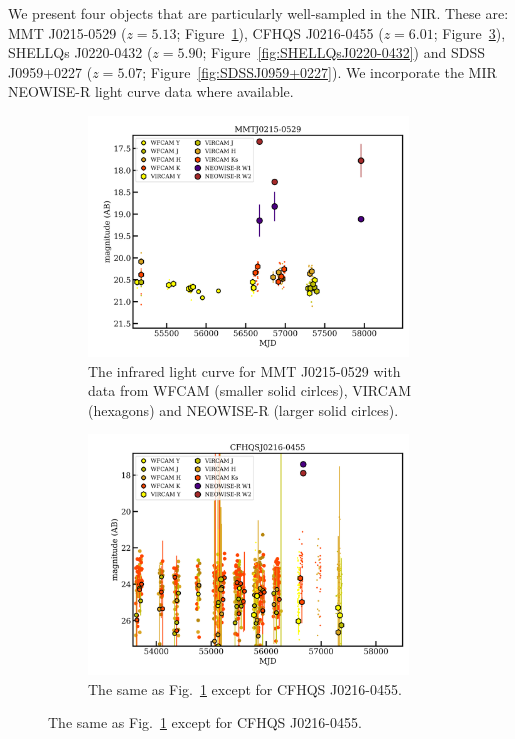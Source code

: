 \documentclass[usenatbib]{mnras}
\begin{document}
We present four objects that are particularly well-sampled in the NIR. 
These are: 
MMT J0215-0529       ($z=5.13$; Figure~\ref{fig:MMTJ0215-0529}), 
CFHQS J0216-0455    ($z=6.01$; Figure~\ref{fig:CFHQSJ0216-0455}), 
SHELLQs J0220-0432 ($z=5.90$; Figure~\ref{fig:SHELLQsJ0220-0432}) 
and 
SDSS J0959+0227 ($z=5.07$; Figure~\ref{fig:SDSSJ0959+0227}). 
We incorporate the MIR NEOWISE-R light curve data where available. 

\begin{figure}
  \begin{subfigure}{}
    \centering
    \includegraphics[width=8.5cm]{../light_curves/MMTJ0215-0529LC_20190214.png}
    \caption{The infrared light curve for MMT J0215-0529 with data from 
      WFCAM (smaller solid cirlces), VIRCAM (hexagons) and NEOWISE-R (larger solid cirlces).}
    \label{fig:MMTJ0215-0529}
  \end{subfigure} 
  \begin{subfigure}{}
    \centering
    \includegraphics[width=8.5cm]{../light_curves/CFHQSJ0216-0455LC_20190214.png}
    \caption{The same as Fig.~\ref{fig:MMTJ0215-0529} except for CFHQS J0216-0455.}
    \label{fig:CFHQSJ0216-0455}
  \end{subfigure}
\end{figure}
\end{document}
